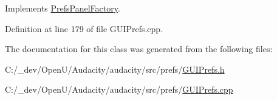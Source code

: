 Implements \hyperlink{class_prefs_panel_factory_a4814184d6050665a43f4929caa73aa0c}{Prefs\+Panel\+Factory}.



Definition at line 179 of file G\+U\+I\+Prefs.\+cpp.



The documentation for this class was generated from the following files\+:\begin{DoxyCompactItemize}
\item 
C\+:/\+\_\+dev/\+Open\+U/\+Audacity/audacity/src/prefs/\hyperlink{_g_u_i_prefs_8h}{G\+U\+I\+Prefs.\+h}\item 
C\+:/\+\_\+dev/\+Open\+U/\+Audacity/audacity/src/prefs/\hyperlink{_g_u_i_prefs_8cpp}{G\+U\+I\+Prefs.\+cpp}\end{DoxyCompactItemize}
